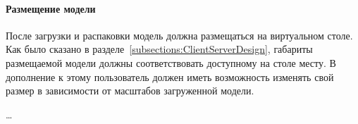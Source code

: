 ﻿\paragraph{Размещение модели}

После загрузки и распаковки модель должна размещаться на виртуальном столе.
Как было сказано в разделе~\ref{subsections:ClientServerDesign},
габариты размещаемой модели должны соответствовать доступному на столе месту.
В дополнение к этому пользователь должен иметь возможность изменять
свой размер в зависимости от масштабов загруженной модели.

\dots

